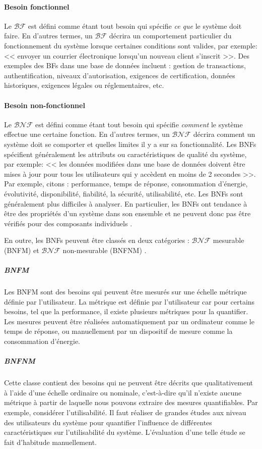 \paragraph{Besoin fonctionnel}
Le $\mathcal{BF}$ est défini comme étant tout besoin qui spécifie \textit{ce que} le système doit faire. En d'autres termes, un $\mathcal{BF}$ décrira un comportement particulier du fonctionnement du système lorsque certaines conditions sont valides, par exemple: << envoyer un courrier électronique lorsqu'un nouveau client s'inscrit >>. Des exemples des BFs dans une base de données incluent : gestion de transactions, authentification, niveaux d'autorisation, exigences de certification, données historiques, exigences légales ou réglementaires, etc.

\paragraph{Besoin non-fonctionnel}
Le $\mathcal{BNF}$ est défini comme étant tout besoin qui spécifie \textit{comment} le système effectue une certaine fonction. En d'autres termes, un $\mathcal{BNF}$ décrira comment un système doit se comporter et quelles limites il y a sur sa fonctionnalité. Les BNFs spécifient généralement les attributs ou caractéristiques de qualité du système, par exemple: << les données modifiées dans une base de données doivent être mises à jour pour tous les utilisateurs qui y accèdent en moins de 2 secondes >>. Par exemple, citons : performance, temps de réponse, consommation d'énergie,  évolutivité, disponibilité, fiabilité, la sécurité, utilisabilité, etc. Les BNFs sont généralement plus difficiles à analyser. En particulier, les BNFs ont tendance à être des propriétés d'un système dans son ensemble et ne peuvent donc pas être vérifiés pour des composants individuels \cite{Nuseibeh00}.

En outre, les BNFs peuvent être classés en deux catégories : $\mathcal{BNF}$ mesurable (BNFM) et $\mathcal{BNF}$ non-mesurable (BNFNM) \cite{Siegmund08}.

\subparagraph{BNFM}
Les BNFM sont des besoins qui peuvent être mesurés sur une échelle métrique définie par l'utilisateur. La métrique est définie par l'utilisateur car pour certains besoins, tel que la performance, il existe plusieurs métriques pour la quantifier. Les mesures peuvent être réalisées automatiquement par un ordinateur comme le temps de réponse, ou manuellement par un dispositif de mesure comme la consommation d'énergie.

\subparagraph{BNFNM}
Cette classe contient des besoins qui ne peuvent être décrits que qualitativement à l'aide d'une échelle ordinaire ou nominale, c'est-à-dire qu'il n'existe aucune métrique à partir de laquelle nous pouvons extraire des mesures quantifiables. Par exemple, considérer l'utilisabilité. Il faut réaliser de grandes études aux niveau des utilisateurs du système pour quantifier l'influence de différentes caractéristiques sur l'utilisabilité du système. L'évaluation d'une telle étude se fait d'habitude manuellement.

